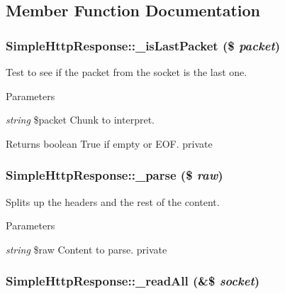 \subsection{Member Function Documentation}
\hypertarget{class_simple_http_response_abdc81c212568dd3fdeabef1856ba8579}{
\subsubsection[{\_\-isLastPacket}]{\setlength{\rightskip}{0pt plus 5cm}SimpleHttpResponse::\_\-isLastPacket (\$ {\em packet})}}
\label{class_simple_http_response_abdc81c212568dd3fdeabef1856ba8579}
Test to see if the packet from the socket is the last one. 
\begin{DoxyParams}{Parameters}
\item[{\em string}]\$packet Chunk to interpret. \end{DoxyParams}
\begin{DoxyReturn}{Returns}
boolean True if empty or EOF.  private 
\end{DoxyReturn}
\hypertarget{class_simple_http_response_a058da3bdd5e2f0589a9a8c807fe69fec}{
\subsubsection[{\_\-parse}]{\setlength{\rightskip}{0pt plus 5cm}SimpleHttpResponse::\_\-parse (\$ {\em raw})}}
\label{class_simple_http_response_a058da3bdd5e2f0589a9a8c807fe69fec}
Splits up the headers and the rest of the content. 
\begin{DoxyParams}{Parameters}
\item[{\em string}]\$raw Content to parse.  private \end{DoxyParams}
\hypertarget{class_simple_http_response_a91aa023b717df912b4dc6696107f76c4}{
\subsubsection[{\_\-readAll}]{\setlength{\rightskip}{0pt plus 5cm}SimpleHttpResponse::\_\-readAll (\&\$ {\em socket})}}
\label{class_simple_http_response_a91aa023b717df912b4dc6696107f76c4}
